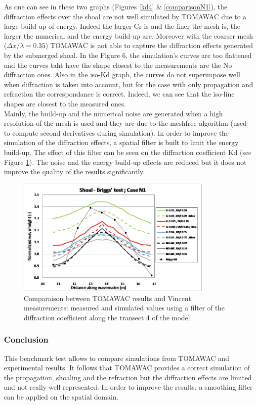 As one can see in these two graphs (Figures \ref{kd4} \& \ref{comparisonN1}), the diffraction effects over the shoal are not well simulated by TOMAWAC due to a large build-up of energy. Indeed the larger Cr is and the finer the mesh is, the larger the numerical and the energy build-up are. Moreover with the coarser mesh ($\Delta x / \lambda = 0.35$) TOMAWAC is not able to capture the diffraction effects generated by the submerged shoal. In the Figure 6, the simulation's curves are too flattened and the curves taht have the shape closest to the measurements are the No diffraction ones. Also in the iso-Kd graph, the curves do not superimpose well when diffraction is taken into account, but for the case with only propagation and refraction the correspondance is correct. Indeed, we can see that the iso-line shapes are closest to the measured ones.\\
Mainly, the build-up and the numerical noise are generated when a high resolution of the mesh is used and they are due to the meshfree algorithm (used to compute second derivatives during simulation). 
In order to improve the simulation of the diffraction effects, a spatial filter is built to limit the energy build-up. The effect of this filter can be seen on the diffraction coefficient Kd (see Figure \ref{kdfilter}). The noise and the energy build-up effects are reduced but it does not improve the quality of the results significantly.\\

\begin{figure}[H]
  \centering
    \includegraphics[width=0.85\textwidth]{kd_filter.jpg}
      \caption{Comparaison between TOMAWAC results and Vincent measurements: measured and simulated values using a filter of the diffraction coefficient along the transect 4 of the model}
\label{kdfilter}
\end{figure}

\subsubsection{Conclusion}
This benchmark test allows to compare simulations from TOMAWAC and experimental results. It follows that TOMAWAC provides a correct simulation of the propagation, shoaling and the refraction but the diffraction effects are limited and not really well represented. In order to improve the results, a smoothing filter can be applied on the spatial domain.\\
